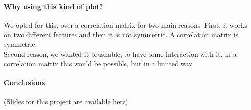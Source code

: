 \documentclass[a4paper, 12pt]{article}
\begin{document}
\paragraph{Why using this kind of plot?}
We opted for this, over a correlation matrix for two main reasons. First, it works on two different
features and then it is not symmetric. A correlation matrix is symmetric.
\\
Second reason, we wanted it brushable, to have some interaction with it. In a correlation matrix this
would be possible, but in a limited way



\paragraph*{Conclusions}

(Slides for this project are available 
\href{https://docs.google.com/presentation/d/1T_p1oarqUuNt5APTaf7IwTJEzUDJC0CoNfJKHdak0so/edit?usp=sharing}{here}).
\end{document}
